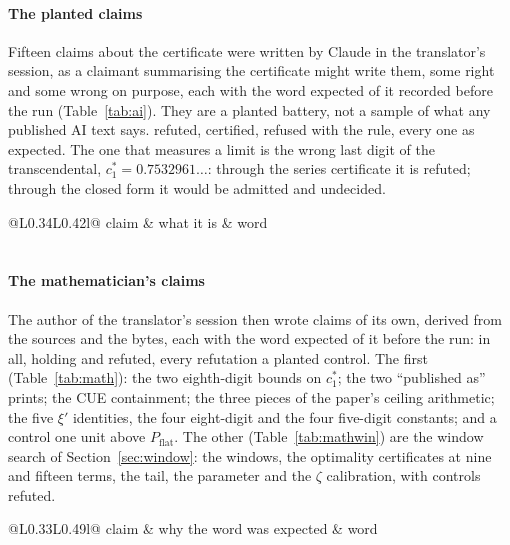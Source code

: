 \documentclass[preprint,11pt,authoryear,a4paper]{elsarticle}
\begin{document}
\paragraph{The planted claims} Fifteen claims about the certificate were written by Claude in the translator's session, as a claimant summarising the certificate might write them, some right and some wrong on purpose, each with the word expected of it recorded before the run (Table~\ref{tab:ai}). They are a planted battery, not a sample of what any published AI text says. \RfAiRefuted{} refuted, \RfAiCertified{} certified, \RfAiRefused{} refused with the rule, every one as expected. The one that measures a limit is the wrong last digit of the transcendental, $c_1^*=0.7532961\ldots$: through the series certificate it is refuted; through the closed form it would be admitted and undecided.

\begin{table}[htbp]\centering\scriptsize\setlength{\tabcolsep}{4pt}
\begin{tabular}{@{}L{0.34\linewidth}L{0.42\linewidth}l@{}}\toprule
claim & what it is & word \\\midrule
\RfAiRows \\
\bottomrule\end{tabular}
\caption{The \RfAiClaims{} planted claims and their words.}\label{tab:ai}
\end{table}

\paragraph{The mathematician's claims} The author of the translator's session then wrote claims of its own, derived from the sources and the bytes, each with the word expected of it before the run: \RfMathClaims{} in all, \RfMathCertified{} holding and \RfMathRefuted{} refuted, every refutation a planted control. The first \RfMathFirst{} (Table~\ref{tab:math}): the two eighth-digit bounds on $c_1^*$; the two ``published as'' prints; the CUE containment; the three pieces of the paper's ceiling arithmetic; the five $\xi'$ identities, the four eight-digit and the four five-digit constants; and a control one unit above $P_{\mathrm{flat}}$. The other \RfMathWin{} (Table~\ref{tab:mathwin}) are the window search of Section~\ref{sec:window}: the windows, the optimality certificates at nine and fifteen terms, the tail, the parameter and the $\zeta$ calibration, with \RfMathWinRefuted{} controls refuted.

\begin{table}[htbp]\centering\scriptsize\setlength{\tabcolsep}{4pt}
\begin{tabular}{@{}L{0.33\linewidth}L{0.49\linewidth}l@{}}\toprule
claim & why the word was expected & word \\\midrule
\RfMathRows \\
\bottomrule\end{tabular}
\caption{The mathematician's first \RfMathFirst{} claims, with the expectation recorded before each run.}\label{tab:math}
\end{table}
\end{document}
